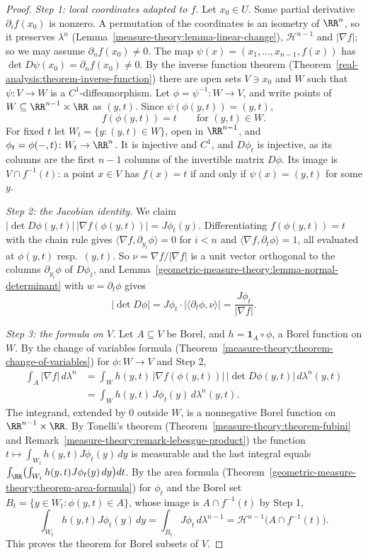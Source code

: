 \begin{proof}
\emph{Step 1: local coordinates adapted to $f$.} Let $x_0 \in U$. Some partial derivative $\partial_if(x_0)$ is nonzero. A permutation of the coordinates is an isometry of $\RR^n$, so it preserves
$\lambda^n$ (Lemma~\ref{measure-theory:lemma-linear-change}), $\mathcal{H}^{n-1}$ and $|\nabla f|$; so we may assume $\partial_nf(x_0) \neq 0$. The map
$\psi(x) = (x_1, \ldots, x_{n-1}, f(x))$ has $\det D\psi(x_0) = \partial_nf(x_0) \neq 0$. By the inverse function theorem (Theorem~\ref{real-analysis:theorem-inverse-function}) there are open sets
$V \ni x_0$ and $W$ such that $\psi \colon V \to W$ is a $C^1$-diffeomorphism. Let $\phi = \psi^{-1} \colon W \to V$, and write points of $W \subseteq \RR^{n-1} \times \RR$ as $(y, t)$. Since
$\psi(\phi(y, t)) = (y, t)$,
\[
f(\phi(y, t)) = t \qquad\text{for } (y, t) \in W .
\]
For fixed $t$ let $W_t = \{y : (y, t) \in W\}$, open in $\RR^{n-1}$, and $\phi_t = \phi(-, t) \colon W_t \to \RR^n$. It is injective and $C^1$, and $D\phi_t$ is injective, as its columns are the first
$n - 1$ columns of the invertible matrix $D\phi$. Its image is $V \cap f^{-1}(t)$: a point $x \in V$ has $f(x) = t$ if and only if $\psi(x) = (y, t)$ for some $y$.

\emph{Step 2: the Jacobian identity.} We claim $|\det D\phi(y, t)|\,|\nabla f(\phi(y, t))| = J\phi_t(y)$. Differentiating $f(\phi(y, t)) = t$ with the chain rule gives
$\langle\nabla f, \partial_{y_i}\phi\rangle = 0$ for $i < n$ and $\langle\nabla f, \partial_t\phi\rangle = 1$, all evaluated at $\phi(y, t)$ resp.\ $(y, t)$. So $\nu = \nabla f/|\nabla f|$ is a unit vector
orthogonal to the columns $\partial_{y_i}\phi$ of $D\phi_t$, and Lemma~\ref{geometric-measure-theory:lemma-normal-determinant} with $w = \partial_t\phi$ gives
\[
|\det D\phi| = J\phi_t\cdot|\langle\partial_t\phi, \nu\rangle| = \frac{J\phi_t}{|\nabla f|} .
\]

\emph{Step 3: the formula on $V$.} Let $A \subseteq V$ be Borel, and $h = \mathbf{1}_A \circ \phi$, a Borel function on $W$. By the change of variables formula
(Theorem~\ref{measure-theory:theorem-change-of-variables}) for $\phi \colon W \to V$ and Step 2,
\[\begin{aligned}
\int_A|\nabla f|\,d\lambda^n &= \int_Wh(y, t)\,|\nabla f(\phi(y, t))|\,|\det D\phi(y, t)|\,d\lambda^n(y, t) \\
&= \int_Wh(y, t)\,J\phi_t(y)\,d\lambda^n(y, t) .
\end{aligned}\]
The integrand, extended by $0$ outside $W$, is a nonnegative Borel function on $\RR^{n-1} \times \RR$. By Tonelli's theorem (Theorem~\ref{measure-theory:theorem-fubini} and
Remark~\ref{measure-theory:remark-lebesgue-product}) the function $t \mapsto \int_{W_t}h(y, t)J\phi_t(y)\,dy$ is measurable and the last integral equals
$\int_\RR\bigl(\int_{W_t}h(y, t)J\phi_t(y)\,dy\bigr)dt$. By the area formula (Theorem~\ref{geometric-measure-theory:theorem-area-formula}) for $\phi_t$ and the Borel set
$B_t = \{y \in W_t : \phi(y, t) \in A\}$, whose image is $A \cap f^{-1}(t)$ by Step 1,
\[
\int_{W_t}h(y, t)J\phi_t(y)\,dy = \int_{B_t}J\phi_t\,d\lambda^{n-1} = \mathcal{H}^{n-1}\bigl(A \cap f^{-1}(t)\bigr).
\]
This proves the theorem for Borel subsets of $V$.


\end{proof}
